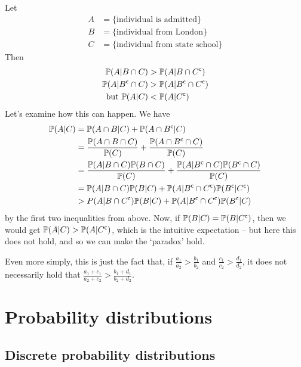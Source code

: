 \documentclass{../template/note}
\begin{document}
\begin{example*}
        Let 
        \begin{align*}
            A &= \{\text{individual is admitted}\} \\
            B &= \{\text{individual from London}\} \\ 
            C &= \{\text{individual from state school}\}
        \end{align*}
        Then
        \begin{align*}
            \mathbb P(A | B \cap C) &> \mathbb P(A | B \cap C^{\mathsf{c}}) \\
            \mathbb P(A | B^{\mathsf{c}} \cap C) &> \mathbb P(A | B^{\mathsf{c}} \cap C^{\mathsf{c}}) \\
            \text{but } \mathbb P(A | C) &< \mathbb P(A | C^{\mathsf{c}})
        \end{align*}
        Let's examine how this can happen. We have
        \begin{align*}
            \mathbb P(A | C) &= \mathbb P(A \cap B | C) + \mathbb P(A \cap B^{\mathsf{c}} | C) \\
            &= \frac{\mathbb P(A \cap B \cap C)}{\mathbb P(C)} + \frac{\mathbb P(A \cap B^{\mathsf{c}} \cap C)}{\mathbb P(C)} \\
            &= \frac{\mathbb P(A | B \cap C)\mathbb P(B \cap C)}{\mathbb P(C)} + \frac{\mathbb P(A | B^{\mathsf{c}} \cap C)\mathbb P(B^{\mathsf{c}} \cap C)}{\mathbb P(C)} \\
            &= \mathbb P(A | B \cap C)\mathbb P(B | C) + \mathbb P(A | B^{\mathsf{c}} \cap C^{\mathsf{c}})\mathbb P(B^{\mathsf{c}} | C^{\mathsf{c}}) \\
            &> P(A | B \cap C^{\mathsf{c}})\mathbb P(B | C) + \mathbb P(A | B^{\mathsf{c}} \cap C^{\mathsf{c}})\mathbb P(B^{\mathsf{c}} | C)
        \end{align*}
        by the first two inequalities from above. Now, if \(\mathbb P(B | C) = \mathbb P(B | C^{\mathsf{c}})\), then we would get \(\mathbb P(A | C) > \mathbb P(A | C^{\mathsf{c}})\), which is the intuitive expectation -- but here this does not hold, and so we can make the `paradox' hold.

        Even more simply, this is just the fact that, if \(\frac{a_1}{a_2} > \frac{b_1}{b_2}\) and \(\frac{c_1}{c_2} > \frac{d_1}{d_2}\), it does not necessarily hold that \(\frac{a_1+c_1}{a_2+c_2} > \frac{b_1+d_1}{b_2+d_2}\).       
    \end{example*}
    
    \section{Probability distributions}

    \subsection{Discrete probability distributions}
\end{document}
